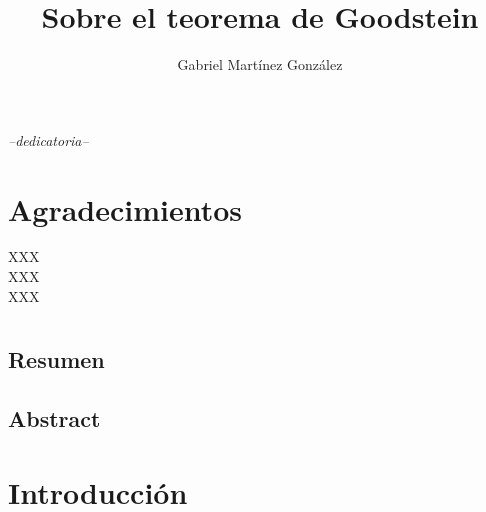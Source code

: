 \documentclass[12pt,a4paper]{book}
\title{Sobre el teorema de Goodstein}
\author{Gabriel Martínez González}
\newcommand{\blankpage}{
    \newpage
  \thispagestyle{empty}
}
\numberwithin{thm}{chapter}
\theoremstyle{definition}
\begin{document}


\blankpage

\hspace{0.5cm}
\newpage
\begin{flushright}
  \textit{--dedicatoria--}
\end{flushright}

\chapter*{Agradecimientos}
\noindent XXX\\
XXX\\
XXX\\

\chapter*{ }
\section*{Resumen}

\section*{Abstract}


\tableofcontents

\chapter*{Introducción}


\end{document}

